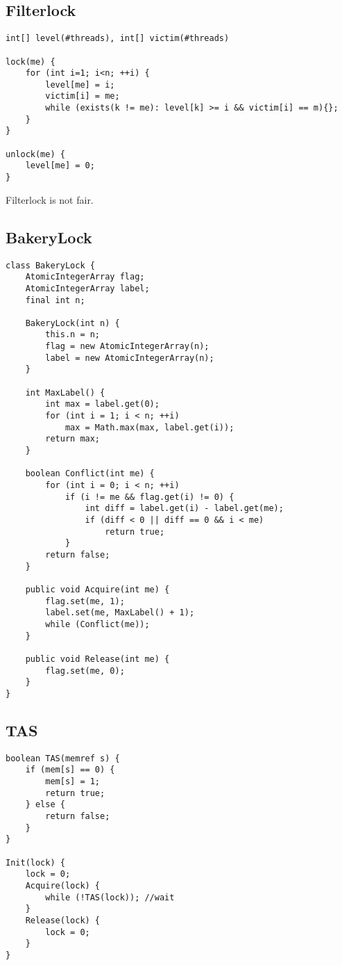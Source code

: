 \documentclass{article}
\begin{document}
\subsection{Filterlock}
\begin{lstlisting}[style=java]
int[] level(#threads), int[] victim(#threads)

lock(me) {
    for (int i=1; i<n; ++i) {
        level[me] = i;
        victim[i] = me;
        while (exists(k != me): level[k] >= i && victim[i] == m){};
    }
}

unlock(me) {
    level[me] = 0;
}
\end{lstlisting}

Filterlock is not fair.

\subsection{BakeryLock}
\begin{lstlisting}[style=java]
class BakeryLock {
    AtomicIntegerArray flag;
    AtomicIntegerArray label;
    final int n;

    BakeryLock(int n) {
        this.n = n;
        flag = new AtomicIntegerArray(n);
        label = new AtomicIntegerArray(n);
    }

    int MaxLabel() {
        int max = label.get(0);
        for (int i = 1; i < n; ++i)
            max = Math.max(max, label.get(i));
        return max;
    }

    boolean Conflict(int me) {
        for (int i = 0; i < n; ++i)
            if (i != me && flag.get(i) != 0) {
                int diff = label.get(i) - label.get(me);
                if (diff < 0 || diff == 0 && i < me)
                    return true;
            }
        return false;
    }

    public void Acquire(int me) {
        flag.set(me, 1);
        label.set(me, MaxLabel() + 1);
        while (Conflict(me));
    }

    public void Release(int me) {
        flag.set(me, 0);
    }
}
\end{lstlisting}

\subsection{TAS}
\begin{lstlisting}[style=java]
boolean TAS(memref s) {
    if (mem[s] == 0) {
        mem[s] = 1;
        return true;
    } else {
        return false;
    }
}

Init(lock) {
    lock = 0;
    Acquire(lock) {
        while (!TAS(lock)); //wait
    }    
    Release(lock) {
        lock = 0;
    }
}
\end{lstlisting}
\end{document}
